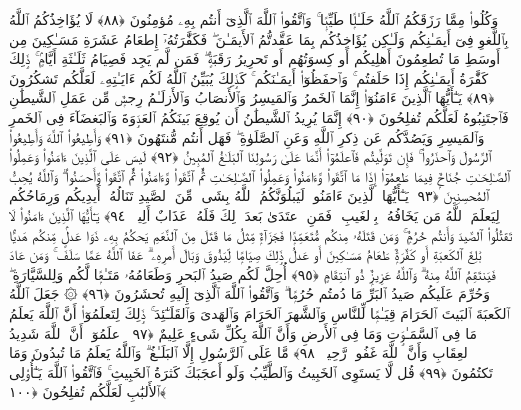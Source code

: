  وَكُلُوا۟ مِمَّا رَزَقَكُمُ ٱللَّهُ حَلَـٰلًۭا طَيِّبًۭا ۚ وَٱتَّقُوا۟ ٱللَّهَ ٱلَّذِىٓ أَنتُم بِهِۦ مُؤمِنُونَ ﴿٨٨﴾
 لَا يُؤَاخِذُكُمُ ٱللَّهُ بِٱللَّغوِ فِىٓ أَيمَـٰنِكُم وَلَـٰكِن يُؤَاخِذُكُم بِمَا عَقَّدتُّمُ ٱلأَيمَـٰنَ ۖ فَكَفَّٰرَتُهُۥٓ إِطعَامُ عَشَرَةِ مَسَـٰكِينَ مِن أَوسَطِ مَا تُطعِمُونَ أَهلِيكُم أَو كِسوَتُهُم أَو تَحرِيرُ رَقَبَةٍۢ ۖ فَمَن لَّم يَجِد فَصِيَامُ ثَلَـٰثَةِ أَيَّامٍۢ ۚ ذَٟلِكَ كَفَّٰرَةُ أَيمَـٰنِكُم إِذَا حَلَفتُم ۚ وَٱحفَظُوٓا۟ أَيمَـٰنَكُم ۚ كَذَٟلِكَ يُبَيِّنُ ٱللَّهُ لَكُم ءَايَـٰتِهِۦ لَعَلَّكُم تَشكُرُونَ ﴿٨٩﴾
 يَـٰٓأَيُّهَا ٱلَّذِينَ ءَامَنُوٓا۟ إِنَّمَا ٱلخَمرُ وَٱلمَيسِرُ وَٱلأَنصَابُ وَٱلأَزلَـٰمُ رِجسٌۭ مِّن عَمَلِ ٱلشَّيطَٰنِ فَٱجتَنِبُوهُ لَعَلَّكُم تُفلِحُونَ ﴿٩٠﴾
 إِنَّمَا يُرِيدُ ٱلشَّيطَٰنُ أَن يُوقِعَ بَينَكُمُ ٱلعَدَٟوَةَ وَٱلبَغضَآءَ فِى ٱلخَمرِ وَٱلمَيسِرِ وَيَصُدَّكُم عَن ذِكرِ ٱللَّهِ وَعَنِ ٱلصَّلَوٰةِ ۖ فَهَل أَنتُم مُّنتَهُونَ ﴿٩١﴾
 وَأَطِيعُوا۟ ٱللَّهَ وَأَطِيعُوا۟ ٱلرَّسُولَ وَٱحذَرُوا۟ ۚ فَإِن تَوَلَّيتُم فَٱعلَمُوٓا۟ أَنَّمَا عَلَىٰ رَسُولِنَا ٱلبَلَـٰغُ ٱلمُبِينُ ﴿٩٢﴾
 لَيسَ عَلَى ٱلَّذِينَ ءَامَنُوا۟ وَعَمِلُوا۟ ٱلصَّـٰلِحَـٰتِ جُنَاحٌۭ فِيمَا طَعِمُوٓا۟ إِذَا مَا ٱتَّقَوا۟ وَّءَامَنُوا۟ وَعَمِلُوا۟ ٱلصَّـٰلِحَـٰتِ ثُمَّ ٱتَّقَوا۟ وَّءَامَنُوا۟ ثُمَّ ٱتَّقَوا۟ وَّأَحسَنُوا۟ ۗ وَٱللَّهُ يُحِبُّ ٱلمُحسِنِينَ ﴿٩٣﴾
 يَـٰٓأَيُّهَا ٱلَّذِينَ ءَامَنُوا۟ لَيَبلُوَنَّكُمُ ٱللَّهُ بِشَىءٍۢ مِّنَ ٱلصَّيدِ تَنَالُهُۥٓ أَيدِيكُم وَرِمَاحُكُم لِيَعلَمَ ٱللَّهُ مَن يَخَافُهُۥ بِٱلغَيبِ ۚ فَمَنِ ٱعتَدَىٰ بَعدَ ذَٟلِكَ فَلَهُۥ عَذَابٌ أَلِيمٌۭ ﴿٩٤﴾
 يَـٰٓأَيُّهَا ٱلَّذِينَ ءَامَنُوا۟ لَا تَقتُلُوا۟ ٱلصَّيدَ وَأَنتُم حُرُمٌۭ ۚ وَمَن قَتَلَهُۥ مِنكُم مُّتَعَمِّدًۭا فَجَزَآءٌۭ مِّثلُ مَا قَتَلَ مِنَ ٱلنَّعَمِ يَحكُمُ بِهِۦ ذَوَا عَدلٍۢ مِّنكُم هَديًۢا بَٰلِغَ ٱلكَعبَةِ أَو كَفَّٰرَةٌۭ طَعَامُ مَسَـٰكِينَ أَو عَدلُ ذَٟلِكَ صِيَامًۭا لِّيَذُوقَ وَبَالَ أَمرِهِۦ ۗ عَفَا ٱللَّهُ عَمَّا سَلَفَ ۚ وَمَن عَادَ فَيَنتَقِمُ ٱللَّهُ مِنهُ ۗ وَٱللَّهُ عَزِيزٌۭ ذُو ٱنتِقَامٍ ﴿٩٥﴾
 أُحِلَّ لَكُم صَيدُ ٱلبَحرِ وَطَعَامُهُۥ مَتَـٰعًۭا لَّكُم وَلِلسَّيَّارَةِ ۖ وَحُرِّمَ عَلَيكُم صَيدُ ٱلبَرِّ مَا دُمتُم حُرُمًۭا ۗ وَٱتَّقُوا۟ ٱللَّهَ ٱلَّذِىٓ إِلَيهِ تُحشَرُونَ ﴿٩٦﴾
 ۞ جَعَلَ ٱللَّهُ ٱلكَعبَةَ ٱلبَيتَ ٱلحَرَامَ قِيَـٰمًۭا لِّلنَّاسِ وَٱلشَّهرَ ٱلحَرَامَ وَٱلهَدىَ وَٱلقَلَـٰٓئِدَ ۚ ذَٟلِكَ لِتَعلَمُوٓا۟ أَنَّ ٱللَّهَ يَعلَمُ مَا فِى ٱلسَّمَـٰوَٟتِ وَمَا فِى ٱلأَرضِ وَأَنَّ ٱللَّهَ بِكُلِّ شَىءٍ عَلِيمٌ ﴿٩٧﴾
 ٱعلَمُوٓا۟ أَنَّ ٱللَّهَ شَدِيدُ ٱلعِقَابِ وَأَنَّ ٱللَّهَ غَفُورٌۭ رَّحِيمٌۭ ﴿٩٨﴾
 مَّا عَلَى ٱلرَّسُولِ إِلَّا ٱلبَلَـٰغُ ۗ وَٱللَّهُ يَعلَمُ مَا تُبدُونَ وَمَا تَكتُمُونَ ﴿٩٩﴾
 قُل لَّا يَستَوِى ٱلخَبِيثُ وَٱلطَّيِّبُ وَلَو أَعجَبَكَ كَثرَةُ ٱلخَبِيثِ ۚ فَٱتَّقُوا۟ ٱللَّهَ يَـٰٓأُو۟لِى ٱلأَلبَٰبِ لَعَلَّكُم تُفلِحُونَ ﴿١٠٠﴾
